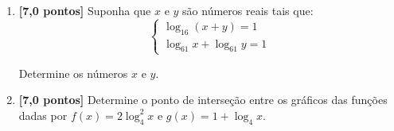 \documentclass[12pt,a4paper]{article}
\begin{document}
\begin{enumerate}
  \item \textbf{[7,0 pontos]} Suponha que $x$ e $y$ são números reais tais que:
  $$\begin{cases} 
    \log_{16} (x+y) = 1\\
    \log_{61} x + \log_{61} y = 1
  \end{cases}$$
  
  Determine os números $x$ e $y$.

  \item \textbf{[7,0 pontos]} Determine o ponto de interseção entre os gráficos
    das funções dadas por \mbox{$f(x) = 2\log_4^2 x$} e $g(x) = 1 + \log_4 x$.
  
\end{enumerate}
\end{document}
